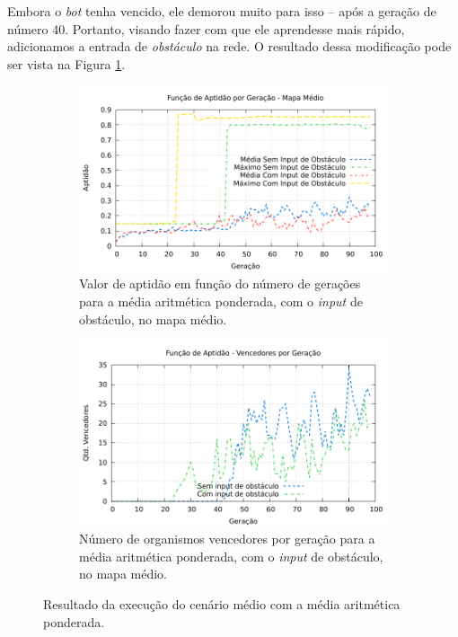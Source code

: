 Embora o \textit{bot} tenha vencido, ele demorou muito para isso -- após a
geração de número 40. Portanto, visando fazer com que ele aprendesse mais
rápido, adicionamos a entrada de \textit{obstáculo} na rede. O resultado dessa
modificação pode ser vista na Figura \ref{fig:medium-wam-obs-fitness-experiment}.

\begin{figure}[H]
\centering
	\begin{subfigure}[b]{0.4\textwidth}
        \includegraphics[width=\textwidth]{fig/medium-wam-obs-fitness-experiment.pdf}
        \caption{Valor de aptidão em função do número de gerações para a média
        aritmética ponderada, com o \textit{input} de obstáculo, no mapa
        médio.}
	\end{subfigure}
	\begin{subfigure}[b]{0.4\textwidth}
        \includegraphics[width=\textwidth]{fig/medium-wam-obs-winners-experiment.pdf}
        \caption{Número de organismos vencedores por geração para a média
        aritmética ponderada, com o \textit{input} de obstáculo, no mapa
        médio.}
	\end{subfigure}

    \caption{Resultado da execução do cenário médio com a média aritmética
    ponderada.}
	\label{fig:medium-wam-obs-fitness-experiment}
\end{figure}

